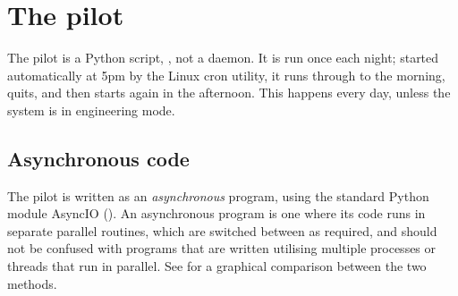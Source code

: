\section{The pilot}
\label{sec:pilot}
\begin{colsection}


\begin{colsection}

The pilot is a Python script, , not a daemon. It is run once each night; started automatically at 5pm by the Linux cron utility, it runs through to the morning, quits, and then starts again in the afternoon. This happens every day, unless the system is in engineering mode.

\end{colsection}


\subsection{Asynchronous code}
\label{sec:async}
\begin{colsection}

The pilot is written as an \textit{asynchronous} program, using the standard Python module AsyncIO (). An asynchronous program is one where its code runs in separate parallel routines, which are switched between as required, and should not be confused with programs that are written utilising multiple processes or threads that run in parallel. See  for a graphical comparison between the two methods.


\end{colsection}
\end{colsection}
